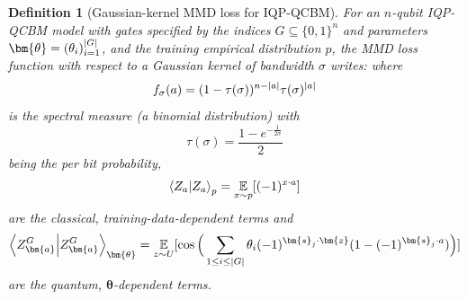 \documentclass[a4paper,onecolumn,notitlepage,nofootinbib,longbibliography,superscriptaddress, floatfix, pra, aps, 10pt]{revtex4-2}
\newcommand{\vttheta}{{\bm{\theta}}}
\newcommand{\vta}{{\bm{a}}}
\newcommand{\vtz}{{\bm{z}}}
\newcommand{\vtsj}{{\bm{s}_j}}
\newtheorem{definition}{Definition}
\begin{document}
\begin{definition}[Gaussian-kernel MMD loss for IQP-QCBM]
\label{def:mmd} For an $n$-qubit IQP-QCBM model with gates specified by the indices $G\subseteq \{0,1\}^n$ and parameters $\vttheta = (\theta_i)_{i=1}^{\abs{G}}$, and the training empirical distribution $p$, the MMD loss function with respect to a Gaussian kernel of bandwidth $\sigma$ writes:
where \begin{equation} f_\sigma(a) = (1-\tau(\sigma))^{n-\abs{a}} \tau(\sigma)^\abs{a} \end{equation} is the spectral measure (a binomial distribution) with \begin{equation} \tau(\sigma) = \frac{1-e^{-\frac{1}{2\sigma}}}{2} \end{equation} being the per bit probability, \begin{equation}
\braket{Z_{a}}_p = \operatorname*{\mathbb{E}}_{x \sim p} [(-1)^{x \cdot a}]\end{equation} are the classical, training-data-dependent terms and 
\begin{equation}
\braket{Z^G_\vta}_\vttheta = \operatorname*{\mathbb{E}}_{z \sim U}[\cos\Big(\sum_{1\leq i \leq \abs{G}} \theta_i(-1)^{\vtsj\cdot \vtz}(1-(-1)^{\vtsj\cdot a})\Big)]\end{equation} are the quantum, $\vttheta$-dependent terms.
\end{definition}



\end{document}
